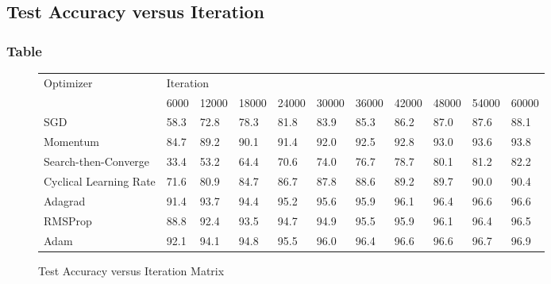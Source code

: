 \documentclass{article}
\begin{document}
\subsection{Test Accuracy versus Iteration}
\subsubsection{Table}
\begin{figure}[H]
	\begin{table}[H]
		\hskip-2.0cm\begin{tabular}{@{}|l|l|l|l|l|l|l|l|l|l|l|@{}}
			\toprule
			\multirow{2}{*}{Optimizer} & \multicolumn{10}{l|}{Iteration}                                              \\ \cmidrule(l){2-11} 
			& 6000 & 12000 & 18000 & 24000 & 30000 & 36000 & 42000 & 48000 & 54000 & 60000 \\ \midrule
			SGD                        & 58.3 & 72.8  & 78.3  & 81.8  & 83.9  & 85.3  & 86.2  & 87.0  & 87.6  & 88.1  \\ \midrule
			Momentum                   & 84.7 & 89.2  & 90.1  & 91.4  & 92.0  & 92.5  & 92.8  & 93.0  & 93.6  & 93.8  \\ \midrule
			Search-then-Converge       & 33.4 & 53.2  & 64.4  & 70.6  & 74.0  & 76.7  & 78.7  & 80.1  & 81.2  & 82.2  \\ \midrule
			Cyclical Learning Rate     & 71.6 & 80.9  & 84.7  & 86.7  & 87.8  & 88.6  & 89.2  & 89.7  & 90.0  & 90.4  \\ \midrule
			Adagrad                    & 91.4 & 93.7  & 94.4  & 95.2  & 95.6  & 95.9  & 96.1  & 96.4  &  96.6 & 96.6  \\ \midrule
			RMSProp                    & 88.8 & 92.4  & 93.5  & 94.7  & 94.9  & 95.5  & 95.9  & 96.1  & 96.4  & 96.5  \\ \midrule
			Adam                       & 92.1 & 94.1  & 94.8  & 95.5  & 96.0  & 96.4  & 96.6  & 96.6  & 96.7  & 96.9  \\ \bottomrule
		\end{tabular}
	\end{table}
	\caption{Test Accuracy versus Iteration Matrix}
	
\end{figure}
\end{document}
